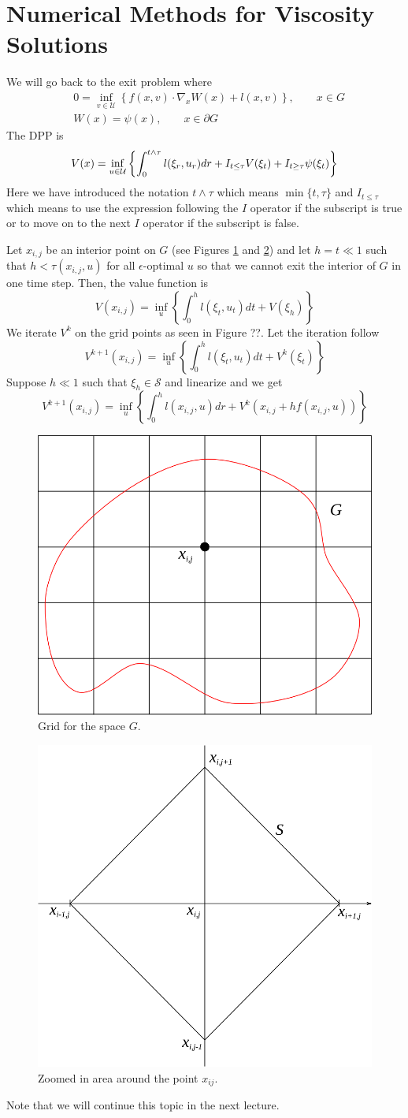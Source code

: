 \section{Numerical Methods for Viscosity Solutions}
We will go back to the exit problem where
\begin{align*}
&0 = \inf_{v\in\mathcal{U}}\left\lbrace f(x,v)\cdot\nabla_xW(x)+l(x,v)\right\rbrace, \qquad x\in G \\
&W(x) = \psi(x), \qquad x\in\partial G
\end{align*}
The DPP is
$$V(x) = \inf_{u\in\mathcal{U}}\left\lbrace \int_0^{t\wedge\tau}l(\xi_r,u_r)dr + I_{t\leq\tau}V(\xi_t) + I_{t\geq\tau}\psi(\xi_t)\right\rbrace$$
Here we have introduced the notation $t\wedge\tau$ which means $\min\{t,\tau\}$ and $I_{t\leq\tau}$ which means to use the expression following the $I$ operator if the subscript is true or to move on to the next $I$ operator if the subscript is false.

Let $x_{i,j}$ be an interior point on $G$ (see Figures \ref{fig:16grid} and \ref{fig:16x}) and let $h=t\ll 1$ such that $h<\tau(x_{i,j},u)$ for all $\epsilon$-optimal $u$ so that we cannot exit the interior of $G$ in one time step. Then, the value function is
$$V(x_{i,j}) = \inf_u\left\lbrace \int_0^hl(\xi_t,u_t)dt+V(\xi_h)\right\rbrace$$
We iterate $V^k$ on the grid points as seen in Figure ??. Let the iteration follow
$$V^{k+1}(x_{i,j}) = \inf_u\left\lbrace \int_0^hl(\xi_t,u_t)dt + V^k(\xi_t)\right\rbrace$$
Suppose $h\ll 1$ such that $\xi_h\in\mathcal{S}$ and linearize and we get
$$V^{k+1}(x_{i,j}) = \inf_u\left\lbrace \int_0^h l(x_{i,j},u)dr+V^k(x_{i,j}+hf(x_{i,j},u))\right\rbrace$$

\begin{figure}[ht!]
	\centering
	\includegraphics[width=.4\textwidth]{images/16grid}
	\caption{Grid for the space $G$.}
	\label{fig:16grid}
\end{figure}

\begin{figure}[ht!]
	\centering
	\includegraphics[width=.4\textwidth]{images/16x}
	\caption{Zoomed in area around the point $x_{ij}$.}
	\label{fig:16x}
\end{figure}

Note that we will continue this topic in the next lecture.

